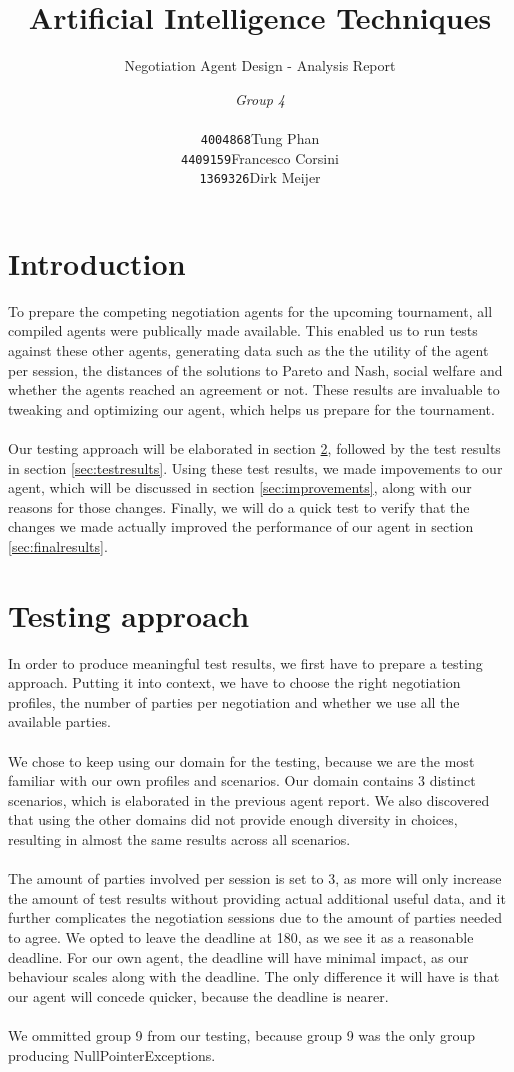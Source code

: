 \documentclass[a4,11pt]{scrartcl}
\title{Artificial Intelligence Techniques}
\subtitle{Negotiation Agent Design - Analysis Report}
\author{\emph{Group 4}\\
\begin{tabular}{ll}
\texttt{4004868}&Tung Phan\\
\texttt{4409159}&Francesco Corsini\\
\texttt{1369326}&Dirk Meijer
\end{tabular}}
\begin{document}
\maketitle

\null\vfill
\tableofcontents
\pagebreak

\section{Introduction}
To prepare the competing negotiation agents for the upcoming tournament, all compiled agents were publically made available. This enabled us to run tests against these other agents, generating data such as the the utility of the agent per session, the distances of the solutions to Pareto and Nash, social welfare and whether the agents reached an agreement or not. These results are invaluable to tweaking and optimizing our agent, which helps us prepare for the tournament.
\\ \\
Our testing approach will be elaborated in section \ref{sec:testingapproach}, followed by the test results in section \ref{sec:testresults}. Using these test results, we made impovements to our agent, which will be discussed in section \ref{sec:improvements}, along with our reasons for those changes. Finally, we will do a quick test to verify that the changes we made actually improved the performance of our agent in section \ref{sec:finalresults}.
    
\section{Testing approach}
\label{sec:testingapproach}
In order to produce meaningful test results, we first have to prepare a testing approach. Putting it into context, we have to choose the right negotiation profiles, the number of parties per negotiation and whether we use all the available parties.
\\ \\
We chose to keep using our domain for the testing, because we are the most familiar with our own profiles and scenarios. Our domain contains 3 distinct scenarios, which is elaborated in the previous agent report. We also discovered that using the other domains did not provide enough diversity in choices, resulting in almost the same results across all scenarios. 
\\ \\
The amount of parties involved per session is set to 3, as more will only increase the amount of test results without providing actual additional useful data, and it further complicates the negotiation sessions due to the amount of parties needed to agree.
We opted to leave the deadline at 180, as we see it as a reasonable deadline. For our own agent, the deadline will have minimal impact, as our behaviour scales along with the deadline. The only difference it will have is that our agent will concede quicker, because the deadline is nearer.
\\ \\
We ommitted group 9 from our testing, because group 9 was the only group producing NullPointerExceptions.
\end{document}
